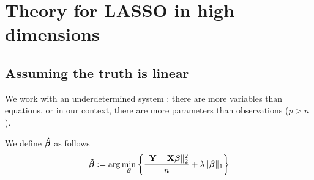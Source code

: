 \chapter{Theory for LASSO in high dimensions}


\section{Assuming the truth is linear}
We work with an underdetermined system : there are more variables than equations, or in our context, there are more parameters than observations (\(p>n\)).



We define $\boldsymbol{\hat{\beta}}$ as follows
\begin{equation}
    \label{eqn: beta hat (LASSO)}
    \boldsymbol{\hat{\beta}}:=\arg \min _{\boldsymbol{\beta}}\left\{ \frac{\|\mathbf{Y}-\mathbf{X} \boldsymbol{\beta}\|_{2}^{2}}{n}+\lambda\|\boldsymbol{\beta}\|_{1} \right\}
\end{equation}

